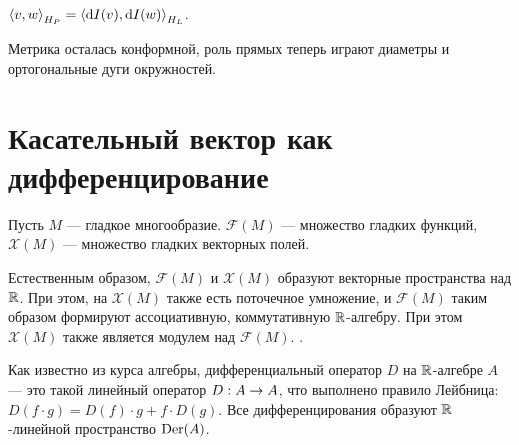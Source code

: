 \documentclass[a4paper]{report}
\begin{document}
    $\left\langle v, w\right\rangle_{H_P} = \left\langle\operatorname{d}\! I(v), \operatorname{d}\! I(w)\right\rangle_{H_L}$.

    Метрика осталась конформной, роль прямых теперь играют диаметры и ортогональные дуги окружностей.
    \section{Касательный вектор как дифференцирование}
    Пусть $M$ --- гладкое многообразие. $\mathscr{F}(M)$ --- множество гладких функций, $\mathscr{X}(M)$ --- множество гладких векторных полей.

    Естественным образом, $\mathscr{F}(M)$ и $\mathscr{X}(M)$ образуют векторные пространства над $\mathbb{R}$.
    При этом, на $\mathscr{X}(M)$ также есть поточечное умножение, и $\mathscr{F}(M)$ таким образом формируют ассоциативную, коммутативную $\mathbb{R}$-алгебру.
    При этом $\mathscr{X}(M)$ также является модулем над $\mathscr{F}(M)$. .

    Как известно из курса алгебры, дифференциальный оператор $D$ на $\mathbb{R}$-алгебре $A$ --- это такой линейный оператор $D: A \rightarrow A$, что выполнено правило Лейбница: $D(f \cdot g) = D(f) \cdot g + f \cdot D(g)$.
    Все дифференцирования образуют $\mathbb{R}$-линейной пространство $\operatorname{Der}(A)$.
\end{document}
